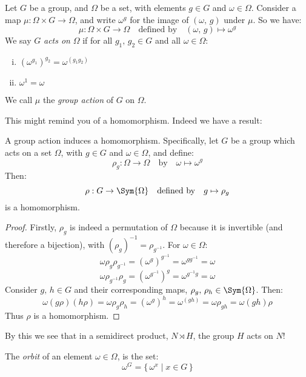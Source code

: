 \begin{definition}
    \raggedright
    Let \(G\) be a group, and \(\Omega\) be a set, with elements \(g \in G\) and \(\omega \in \Omega\).
    Consider a map \(\mu:\Omega \times G \to \Omega\), and write \(\omega^g\) for the image of \((\omega,\,g)\) under
    \(\mu\).
    So we have:
    \[\mu:\Omega \times G \to \Omega \quad \text{defined by} \quad (\omega,\,g) \mapsto \omega^g\]
    We say \(G\) \emph{acts on} \(\Omega\) if for all \(g_1,\,g_2 \in G\) and all \(\omega \in \Omega\):
    \begin{enumerate}[(i)]
        \item \({(\omega^{g_1})}^{g_2} = \omega^{(g_1 g_2)}\)
        \item \(\omega^1 = \omega\)
    \end{enumerate}
    We call \(\mu\) the \emph{group action} of \(G\) on \(\Omega\).
\end{definition}

This might remind you of a homomorphism.
Indeed we have a result:

\begin{lemma}\label{lem:actionhom}
    \raggedright
    A group action induces a homomorphism.
    Specifically, let \(G\) be a group which acts on a set \(\Omega\), with \(g \in G\) and \(\omega \in \Omega\), and
    define:
    \[\rho_g:\Omega \to \Omega \quad \text{by} \quad \omega \mapsto \omega^g\]
    Then:
    \[\rho:G \to \Sym{\Omega} \quad \text{defined by} \quad g \mapsto \rho_g\]
    is a homomorphism.
\end{lemma}

\begin{proof}
    Firstly, \(\rho_g\) is indeed a permutation of \(\Omega\) because it is invertible (and therefore a bijection),
    with \({(\rho_g)}^{-1} = \rho_{g^{-1}}\).
    For \(\omega \in \Omega\):
    \[ \omega \rho_g \rho_{g^{-1}} = {(\omega^g)}^{g^{-1}} = \omega^{gg^{-1}} = \omega \]
    \[ \omega \rho_{g^{-1}} \rho_g = {(\omega^{g^{-1}})}^g = \omega^{g^{-1}g} = \omega \]
    Consider \(g,\,h \in G\) and their corresponding maps, \(\rho_{g},\,\rho_{h} \in \Sym{\Omega}\).
    Then:
    \[\omega(g\rho)(h\rho) = \omega\rho_g\rho_h = {(\omega^g)}^h = \omega^{(gh)} = \omega\rho_{gh} = \omega(gh)\rho\]
    Thus \(\rho\) is a homomorphism.
\end{proof}

By this we see that in a semidirect product, \(N \rtimes H\), the group \(H\) acts on \(N\)!

\begin{definition}
    \raggedright
    The \emph{orbit} of an element \(\omega \in \Omega\), is the set:
    \[\omega^G = \{\,\omega^x \mid x \in G\,\}\]
\end{definition}

